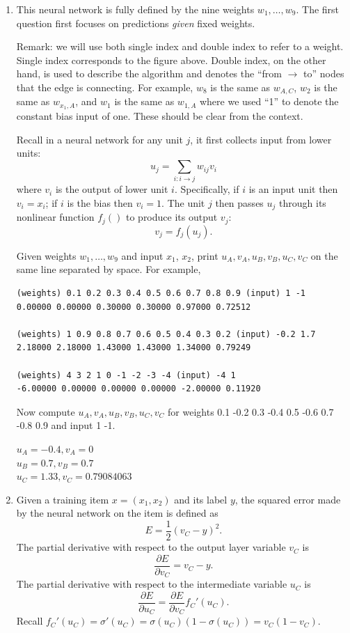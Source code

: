 \documentclass[a4paper]{article}
\theoremstyle{definition}
\newenvironment{soln}{
    \leavevmode\color{blue}\ignorespaces
}{}
\begin{document}
\begin{enumerate}
\item
This neural network is fully defined by the nine weights $w_1, \ldots, w_9$.
The first question first focuses on predictions \emph{given} fixed weights.

Remark: we will use both single index and double index to refer to a weight.
Single index corresponds to the figure above.
Double index, on the other hand, is used to describe the algorithm and denotes the ``from $\rightarrow$ to'' nodes that the edge is connecting.
For example, $w_8$ is the same as $w_{A,C}$, $w_2$ is the same as $w_{x_1, A}$, and $w_1$ is the same as $w_{1,A}$ where we used ``1'' to denote the constant bias input of one.
These should be clear from the context.

Recall in a neural network for any unit $j$, it first collects input from lower units:
$$u_j = \sum_{i: i\rightarrow j} w_{ij} v_i$$
where $v_i$ is the output of lower unit $i$. Specifically, if $i$ is an input unit then $v_i=x_i$; if $i$ is the bias then $v_i=1$.
The unit $j$ then passes $u_j$ through its nonlinear function $f_j()$ to produce its output $v_j$:
$$v_j = f_j(u_j).$$

Given weights $w_1, \ldots, w_9$ and input $x_1$, $x_2$,
print $u_A, v_A, u_B, v_B, u_C, v_C$ on the same line separated by space. 
For example,
\begin{verbatim}
(weights) 0.1 0.2 0.3 0.4 0.5 0.6 0.7 0.8 0.9 (input) 1 -1
0.00000 0.00000 0.30000 0.30000 0.97000 0.72512 

(weights) 1 0.9 0.8 0.7 0.6 0.5 0.4 0.3 0.2 (input) -0.2 1.7
2.18000 2.18000 1.43000 1.43000 1.34000 0.79249 

(weights) 4 3 2 1 0 -1 -2 -3 -4 (input) -4 1
-6.00000 0.00000 0.00000 0.00000 -2.00000 0.11920 
\end{verbatim}

Now compute $u_A, v_A, u_B, v_B, u_C, v_C$ for weights 0.1 -0.2 0.3 -0.4 0.5 -0.6 0.7 -0.8 0.9 and input 1 -1.

\begin{soln}
$u_A = -0.4, v_A= 0$\\
$u_B = 0.7,  v_B = 0.7$\\
$u_C = 1.33, v_C = 0.79084063$
\end{soln}

\item
Given a training item $x=(x_1, x_2)$ and its label $y$, the squared error made by the neural network on the item is defined as
$$E = \frac{1}{2}(v_C - y)^2.$$
The partial derivative with respect to the output layer variable $v_C$ is 
$$\frac{\partial E}{\partial v_C} = v_C - y.$$
The partial derivative with respect to the intermediate variable $u_C$ is 
$$\frac{\partial E}{\partial u_C} = \frac{\partial E}{\partial v_C} f_C'(u_C).$$
Recall $f_C'(u_C) = \sigma'(u_C) = \sigma(u_C)(1-\sigma(u_C)) = v_C (1-v_C)$.


\end{enumerate}
\end{document}
